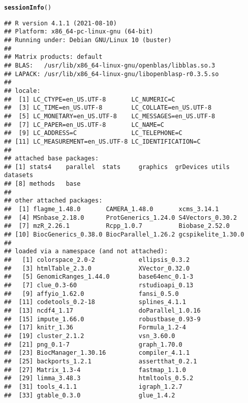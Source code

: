 \documentclass{article}\usepackage[]{graphicx}\usepackage[]{color}
\makeatletter
\newcommand{\hlstd}[1]{\textcolor[rgb]{0.345,0.345,0.345}{#1}}%
\newcommand{\hlkwd}[1]{\textcolor[rgb]{0.737,0.353,0.396}{\textbf{#1}}}%
\newenvironment{kframe}{%
 \def\at@end@of@kframe{}%
 \ifinner\ifhmode%
  \def\at@end@of@kframe{\end{minipage}}%
  \begin{minipage}{\columnwidth}%
 \fi\fi%
 \def\FrameCommand##1{\hskip\@totalleftmargin \hskip-\fboxsep
 \colorbox{shadecolor}{##1}\hskip-\fboxsep
     \hskip-\linewidth \hskip-\@totalleftmargin \hskip\columnwidth}%
 \MakeFramed {\advance\hsize-\width
   \@totalleftmargin\z@ \linewidth\hsize
   \@setminipage}}%
 {\par\unskip\endMakeFramed%
 \at@end@of@kframe}
\newenvironment{knitrout}{}{} %
\makeatother
\begin{document}
\begin{knitrout}
\color{fgcolor}\begin{kframe}
\begin{alltt}
\hlkwd{sessionInfo}\hlstd{()}
\end{alltt}
\begin{verbatim}
## R version 4.1.1 (2021-08-10)
## Platform: x86_64-pc-linux-gnu (64-bit)
## Running under: Debian GNU/Linux 10 (buster)
## 
## Matrix products: default
## BLAS:   /usr/lib/x86_64-linux-gnu/openblas/libblas.so.3
## LAPACK: /usr/lib/x86_64-linux-gnu/libopenblasp-r0.3.5.so
## 
## locale:
##  [1] LC_CTYPE=en_US.UTF-8       LC_NUMERIC=C              
##  [3] LC_TIME=en_US.UTF-8        LC_COLLATE=en_US.UTF-8    
##  [5] LC_MONETARY=en_US.UTF-8    LC_MESSAGES=en_US.UTF-8   
##  [7] LC_PAPER=en_US.UTF-8       LC_NAME=C                 
##  [9] LC_ADDRESS=C               LC_TELEPHONE=C            
## [11] LC_MEASUREMENT=en_US.UTF-8 LC_IDENTIFICATION=C       
## 
## attached base packages:
## [1] stats4    parallel  stats     graphics  grDevices utils     datasets 
## [8] methods   base     
## 
## other attached packages:
##  [1] flagme_1.48.0       CAMERA_1.48.0       xcms_3.14.1        
##  [4] MSnbase_2.18.0      ProtGenerics_1.24.0 S4Vectors_0.30.2   
##  [7] mzR_2.26.1          Rcpp_1.0.7          Biobase_2.52.0     
## [10] BiocGenerics_0.38.0 BiocParallel_1.26.2 gcspikelite_1.30.0 
## 
## loaded via a namespace (and not attached):
##   [1] colorspace_2.0-2            ellipsis_0.3.2             
##   [3] htmlTable_2.3.0             XVector_0.32.0             
##   [5] GenomicRanges_1.44.0        base64enc_0.1-3            
##   [7] clue_0.3-60                 rstudioapi_0.13            
##   [9] affyio_1.62.0               fansi_0.5.0                
##  [11] codetools_0.2-18            splines_4.1.1              
##  [13] ncdf4_1.17                  doParallel_1.0.16          
##  [15] impute_1.66.0               robustbase_0.93-9          
##  [17] knitr_1.36                  Formula_1.2-4              
##  [19] cluster_2.1.2               vsn_3.60.0                 
##  [21] png_0.1-7                   graph_1.70.0               
##  [23] BiocManager_1.30.16         compiler_4.1.1             
##  [25] backports_1.2.1             assertthat_0.2.1           
##  [27] Matrix_1.3-4                fastmap_1.1.0              
##  [29] limma_3.48.3                htmltools_0.5.2            
##  [31] tools_4.1.1                 igraph_1.2.7               
##  [33] gtable_0.3.0                glue_1.4.2                 

\end{verbatim}
\end{kframe}
\end{knitrout}
\end{document}
